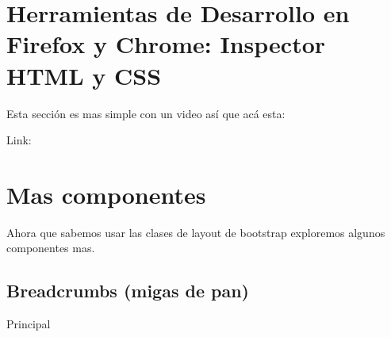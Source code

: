 \documentclass[letterpaper,10pt,spanish]{sphinxmanual}
\begin{document}
\chapter{Herramientas de Desarrollo en Firefox y Chrome: Inspector HTML y CSS}
\label{\detokenize{herramientas-desarrollador::doc}}\label{\detokenize{herramientas-desarrollador:herramientas-de-desarrollo-en-firefox-y-chrome-inspector-html-y-css}}
Esta sección es mas simple con un video así que acá esta:



Link: 


\chapter{Mas componentes}
\label{\detokenize{mas-componentes:mas-componentes}}\label{\detokenize{mas-componentes::doc}}
Ahora que sabemos usar las clases de layout de bootstrap exploremos algunos
componentes mas.




\section{Breadcrumbs (migas de pan)}
\label{\detokenize{mas-componentes:breadcrumbs-migas-de-pan}}
%
\begin{sphinxVerbatim}[commandchars=\\\{\}]
 
   
      Principal
\end{sphinxVerbatim}
\end{document}
